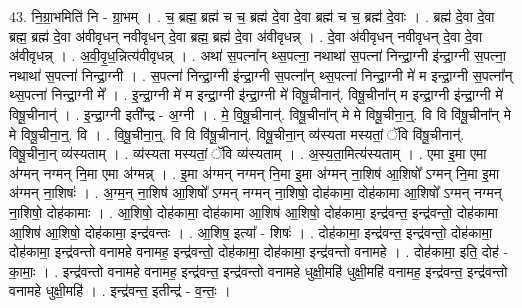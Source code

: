 \documentclass[17pt]{extarticle}
\begin{document}
43. नि॒ग्रा॒भमिति॑ नि - ग्रा॒भम् । . च॒ ब्रह्म॒ ब्रह्म॑ च च॒ ब्रह्म॑ दे॒वा दे॒वा ब्रह्म॑ च च॒ ब्रह्म॑ दे॒वाः । . ब्रह्म॑ दे॒वा दे॒वा ब्रह्म॒ ब्रह्म॑ दे॒वा अ॑वीवृधन् नवीवृधन् दे॒वा ब्रह्म॒ ब्रह्म॑ दे॒वा अ॑वीवृधन्न् । . दे॒वा अ॑वीवृधन् नवीवृधन् दे॒वा दे॒वा अ॑वीवृधन्न् । . अ॒वी॒वृ॒ध॒न्नित्य॑वीवृधन्न् । . अथा॑ स॒पत्ना᳚न् थ्स॒पत्ना॒ नथाथा॑ स॒पत्ना॑ निन्द्रा॒ग्नी इ॑न्द्रा॒ग्नी स॒पत्ना॒ नथाथा॑ स॒पत्ना॑ निन्द्रा॒ग्नी । . स॒पत्ना॑ निन्द्रा॒ग्नी इ॑न्द्रा॒ग्नी स॒पत्ना᳚न् थ्स॒पत्ना॑ निन्द्रा॒ग्नी मे॑ म इन्द्रा॒ग्नी स॒पत्ना᳚न् थ्स॒पत्ना॑ निन्द्रा॒ग्नी मे᳚ । . इ॒न्द्रा॒ग्नी मे॑ म इन्द्रा॒ग्नी इ॑न्द्रा॒ग्नी मे॑ विषू॒चीनान्॑. विषू॒चीना᳚न् म इन्द्रा॒ग्नी इ॑न्द्रा॒ग्नी मे॑ विषू॒चीनान्॑ । . इ॒न्द्रा॒ग्नी इती᳚न्द्र - अ॒ग्नी । . मे॒ वि॒षू॒चीनान्॑. विषू॒चीना᳚न् मे मे विषू॒चीना॒न्॒. वि वि वि॑षू॒चीना᳚न् मे मे विषू॒चीना॒न्॒. वि । . वि॒षू॒चीना॒न्॒. वि वि वि॑षू॒चीनान्॑. विषू॒चीना॒न् व्य॑स्यता मस्यतां॒ ॅवि वि॑षू॒चीनान्॑. विषू॒चीना॒न् व्य॑स्यताम् । . व्य॑स्यता मस्यतां॒ ॅवि व्य॑स्यताम् । . अ॒स्य॒ता॒मित्य॑स्यताम् । . एमा इ॒मा एमा अ॑ग्मन् नग्मन् नि॒मा एमा अ॑ग्मन्न् । . इ॒मा अ॑ग्मन् नग्मन् नि॒मा इ॒मा अ॑ग्मन् ना॒शिष॑ आ॒शिषो᳚ ऽग्मन् नि॒मा इ॒मा अ॑ग्मन् ना॒शिषः॑ । . अ॒ग्म॒न् ना॒शिष॑ आ॒शिषो᳚ ऽग्मन् नग्मन् ना॒शिषो॒ दोह॑कामा॒ दोह॑कामा आ॒शिषो᳚ ऽग्मन् नग्मन् ना॒शिषो॒ दोह॑कामाः । . आ॒शिषो॒ दोह॑कामा॒ दोह॑कामा आ॒शिष॑ आ॒शिषो॒ दोह॑कामा॒ इन्द्र॑वन्त॒ इन्द्र॑वन्तो॒ दोह॑कामा आ॒शिष॑ आ॒शिषो॒ दोह॑कामा॒ इन्द्र॑वन्तः । . आ॒शिष॒ इत्या᳚ - शिषः॑ । . दोह॑कामा॒ इन्द्र॑वन्त॒ इन्द्र॑वन्तो॒ दोह॑कामा॒ दोह॑कामा॒ इन्द्र॑वन्तो वनामहे वनामह॒ इन्द्र॑वन्तो॒ दोह॑कामा॒ दोह॑कामा॒ इन्द्र॑वन्तो वनामहे । . दोह॑कामा॒ इति॒ दोह॑ - का॒माः॒ । . इन्द्र॑वन्तो वनामहे वनामह॒ इन्द्र॑वन्त॒ इन्द्र॑वन्तो वनामहे धुक्षी॒महि॑ धुक्षी॒महि॑ वनामह॒ इन्द्र॑वन्त॒ इन्द्र॑वन्तो वनामहे धुक्षी॒महि॑ । . इन्द्र॑वन्त॒ इतीन्द्र॑ - व॒न्तः॒ । \newline
\pagebreak
{}
\end{document}
